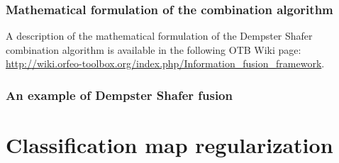 \subsubsection{Mathematical formulation of the combination algorithm}

A description of the mathematical formulation of the Dempster Shafer combination 
algorithm is available in the following OTB Wiki page: 
\href{http://wiki.orfeo-toolbox.org/index.php/Information_fusion_framework}{http://wiki.orfeo-toolbox.org/index.php/Information\_fusion\_framework}.

\subsubsection{An example of Dempster Shafer fusion}
\ifitkFullVersion

\fi



\section{Classification map regularization}


\ifitkFullVersion

\fi



